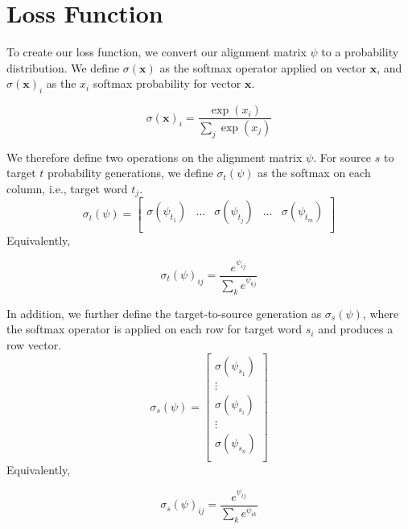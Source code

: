 \documentclass[twoside,twocolumn]{article}
\renewcommand{\vec}[1]{\mathbf{#1}}
\newlength\mystoreparindent
\newenvironment{myparindent}[1]{%
  \setlength{\mystoreparindent}{\the\parindent}
  \setlength{\parindent}{#1}
  }{%
  \setlength{\parindent}{\mystoreparindent}
}
\begin{document}
\clearpage
\appendix
\onecolumn
\begin{myparindent}{0pt}
\section{Loss Function}
\label{appendix:loss-function}
To create our loss function, we convert our alignment matrix $\psi$ to a
probability distribution. We define $\sigma(\vec{x})$ as the softmax operator
applied on vector $\vec{x}$, and $\sigma(\vec{x})_i$ as the $x_i$ softmax
probability for vector $\vec{x}$.

\begin{equation}
\sigma(\vec{x})_i = \frac{\exp(x_i)}{\sum_j\exp(x_j)}
\end{equation}

We therefore define two operations on the alignment matrix $\psi$. For source
$s$ to target $t$ probability generations, we define $\sigma_t(\psi)$ as the
softmax on each column, i.e., target word $t_j$.
\begin{equation}
  \sigma_t(\psi) = \left[
    \begin{matrix}
      \sigma(\psi_{t_1}) &
      \hdots &
      \sigma(\psi_{t_j}) &
      \hdots &
      \sigma(\psi_{t_m})  \\
    \end{matrix}
\right]
\end{equation}
Equivalently,

\begin{equation}
  \sigma_t(\psi)_{ij} = \frac{e^{\psi_{ij}}}{\sum_{k} e^{\psi_{kj}}}
\end{equation}

In addition, we further define the target-to-source generation as
$\sigma_s(\psi)$, where the softmax operator is applied on each row for target
word $s_i$ and produces a row vector.
\begin{equation}
  \sigma_s(\psi) = \left[
    \begin{matrix}
      \sigma(\psi_{s_1})  \\
      \vdots \\
      \sigma(\psi_{s_i})  \\
      \vdots \\
      \sigma(\psi_{s_n})  \\
    \end{matrix}
\right]
\end{equation}
Equivalently,

\begin{equation}
  \sigma_s(\psi)_{ij} = \frac{e^{\psi_{ij}}}{\sum_{k} e^{\psi_{ik}}}
\end{equation}


\end{myparindent}
\end{document}

